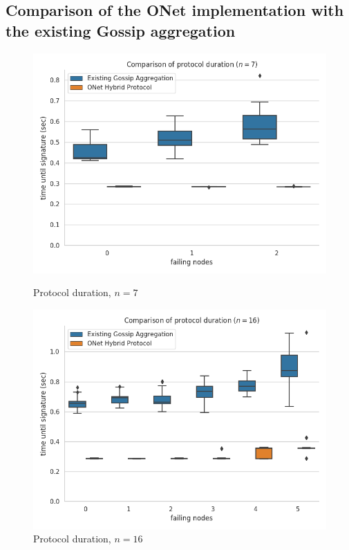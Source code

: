 \subsection*{Comparison  of  the  ONet  implementation  with  the  existing Gossip aggregation}

\begin{figure}[H]
    \centering
    \begin{minipage}{0.5\textwidth}
        \centering
        \includegraphics[width=\textwidth]{images/round_wall_sum_7.png}
        \captionsetup{labelformat=empty}
        \caption{Protocol duration, $n = 7$}
    \end{minipage}\hfill
    \begin{minipage}{0.5\textwidth}
        \centering
        \includegraphics[width=\textwidth]{images/round_wall_sum_16.png}
        \captionsetup{labelformat=empty}
        \caption{Protocol duration, $n = 16$}
    \end{minipage}\hfill
\end{figure}

